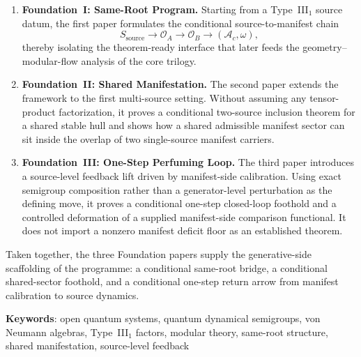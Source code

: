 \documentclass[12pt,a4paper,openany]{book}
\begin{document}
\begin{enumerate}
\item \textbf{Foundation~I: Same-Root Program.} Starting from a
Type~III$_1$ source datum, the first paper formulates the conditional
source-to-manifest chain
\[
S_{\mathrm{source}} \to \mathcal O_A \to \mathcal O_B \to (\mathcal A_c,\omega),
\]
thereby isolating the theorem-ready interface that later feeds the
geometry--modular-flow analysis of the core trilogy.

\item \textbf{Foundation~II: Shared Manifestation.} The second paper
extends the framework to the first multi-source setting. Without
assuming any tensor-product factorization, it proves a conditional
two-source inclusion theorem for a shared stable hull and shows how a
shared admissible manifest sector can sit inside the overlap of two
single-source manifest carriers.

\item \textbf{Foundation~III: One-Step Perfuming Loop.} The third paper
introduces a source-level feedback lift driven by manifest-side
calibration. Using exact semigroup composition rather than a
generator-level perturbation as the defining move, it proves a
conditional one-step closed-loop foothold and a controlled deformation
of a supplied manifest-side comparison functional. It does not import a
nonzero manifest deficit floor as an established theorem.
\end{enumerate}

Taken together, the three Foundation papers supply the generative-side
scaffolding of the programme: a conditional same-root bridge, a
conditional shared-sector foothold, and a conditional one-step return
arrow from manifest calibration to source dynamics.

\bigskip
\noindent\textbf{Keywords}: open quantum systems, quantum dynamical
semigroups, von Neumann algebras, Type~III$_1$ factors, modular theory,
same-root structure, shared manifestation, source-level feedback

\tableofcontents

\mainmatter






\end{document}
